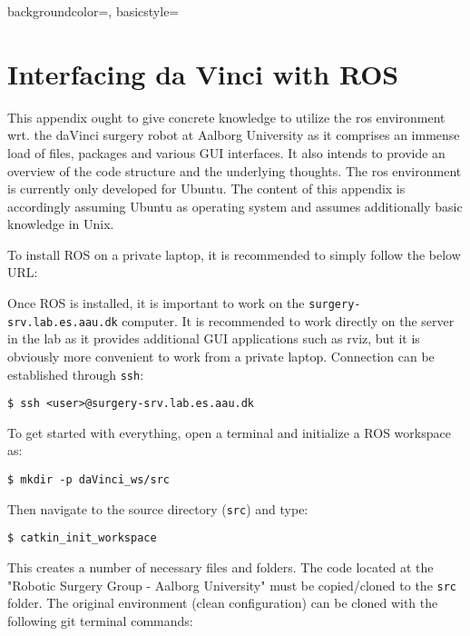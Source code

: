 {
    backgroundcolor=\color{black},
    basicstyle=\scriptsize\color{green}%
}
\chapter{Interfacing da Vinci with ROS}\label{app:ros}
This appendix ought to give concrete knowledge to utilize the \gls{ros} environment wrt. the \gls{daVinci} surgery robot at Aalborg University as it comprises an immense load of files, packages and various GUI interfaces. It also intends to provide an overview of the code structure and the underlying thoughts. The \gls{ros} environment is currently only developed for Ubuntu. The content of this appendix is accordingly assuming Ubuntu as operating system and assumes additionally basic knowledge in Unix. 

To install ROS on a private laptop, it is recommended to simply follow the below URL:

\hspace{1cm} {}

Once ROS is installed, it is important to work on the \texttt{surgery-srv.lab.es.aau.dk} computer. It is recommended to work directly on the server in the lab as it provides additional GUI applications such as rviz, but it is obviously more convenient to work from a private laptop. Connection can be established through \texttt{ssh}:

\hspace{1cm} \texttt{\$ ssh <user>@surgery-srv.lab.es.aau.dk}

To get started with everything, open a terminal and initialize a ROS workspace as:

\hspace{1cm} \texttt{\$ mkdir -p daVinci\_ws/src}

Then navigate to the source directory (\texttt{src}) and type:

\hspace{1cm} \texttt{\$ catkin\_init\_workspace}

This creates a number of necessary files and folders. The code located at the "Robotic Surgery Group - Aalborg University" must be copied/cloned to the \texttt{src} folder. %
The original environment (clean configuration) can be cloned with the following git terminal commands:\vspace{0.1cm}

